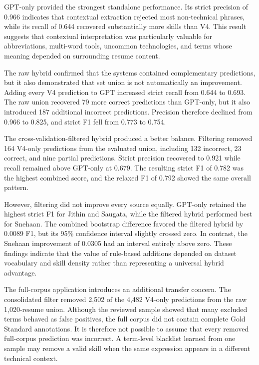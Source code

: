 \documentclass[conference]{IEEEtran}
\begin{document}
GPT-only provided the strongest standalone performance. Its strict
precision of 0.966 indicates that contextual extraction rejected most
non-technical phrases, while its recall of 0.644 recovered substantially
more skills than V4. This result suggests that contextual interpretation
was particularly valuable for abbreviations, multi-word tools, uncommon
technologies, and terms whose meaning depended on surrounding resume
content.

The raw hybrid confirmed that the systems contained complementary
predictions, but it also demonstrated that set union is not automatically
an improvement. Adding every V4 prediction to GPT increased strict
recall from 0.644 to 0.693. The raw union recovered 79 more correct
predictions than GPT-only, but it also introduced 187 additional
incorrect predictions. Precision therefore declined from 0.966 to 0.825,
and strict F1 fell from 0.773 to 0.754.

The cross-validation-filtered hybrid produced a better balance. Filtering
removed 164 V4-only predictions from the evaluated union, including 132
incorrect, 23 correct, and nine partial predictions. Strict precision
recovered to 0.921 while recall remained above GPT-only at 0.679. The
resulting strict F1 of 0.782 was the highest combined score, and the
relaxed F1 of 0.792 showed the same overall pattern.

However, filtering did not improve every source equally. GPT-only
retained the highest strict F1 for Jithin and Saugata, while the filtered
hybrid performed best for Snehaan. The combined bootstrap difference
favored the filtered hybrid by 0.0089 F1, but its 95\% confidence interval
slightly crossed zero. In contrast, the Snehaan improvement of 0.0305
had an interval entirely above zero. These findings indicate that the
value of rule-based additions depended on dataset vocabulary and skill
density rather than representing a universal hybrid advantage.

The full-corpus application introduces an additional transfer concern.
The consolidated filter removed 2,502 of the 4,482 V4-only predictions
from the raw 1,020-resume union. Although the reviewed sample showed
that many excluded terms behaved as false positives, the full corpus
did not contain complete Gold Standard annotations. It is therefore not
possible to assume that every removed full-corpus prediction was
incorrect. A term-level blacklist learned from one sample may remove a
valid skill when the same expression appears in a different technical
context.
\end{document}
